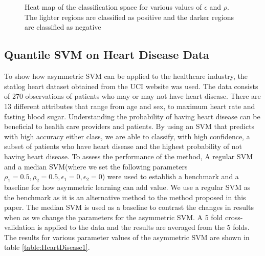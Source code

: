\documentclass[twoside,11pt]{article}
\begin{document}
\begin{figure}[htp]
  \begin{center}
     \\
     \\
  \end{center}
  \caption{Heat map of the classification space for various values of $\epsilon$ and $\rho$. The lighter regions are classified as positive and the darker regions are classified as negative}
  \label{fig:edge}
\end{figure}



\subsection{Quantile SVM on Heart Disease Data}
To show how asymmetric SVM can be applied to the healthcare industry, the statlog heart dataset obtained from the UCI website was used. The data consists of 270 observations of patients who may or may not have heart disease. There are 13 different attributes that range from age and sex, to maximum heart rate and fasting blood sugar. Understanding the probability of having heart disease can be beneficial to health care providers and patients. By using an SVM that predicts with high accuracy either class, we are able to classify, with high confidence, a subset of patients who have heart disease and the highest probability of not having heart disease. To assess the performance of the method, A regular SVM and a median SVM(where we set the following parameters $\rho_1=0.5,\rho_2=0.5,\epsilon_1=0,\epsilon_2=0$) were used to establish a benchmark and a baseline for how asymmetric learning can add value. We use a regular SVM as the benchmark as it is an alternative method to the method proposed in this paper. The median SVM is used as a baseline to contrast the changes in results when as we change the parameters for the asymmetric SVM. A 5 fold cross-validation is applied to the data and the results are averaged from the 5 folds. The results for various parameter values of the asymmetric SVM are shown in table \ref{table:HeartDisease1}. 
\end{document}
